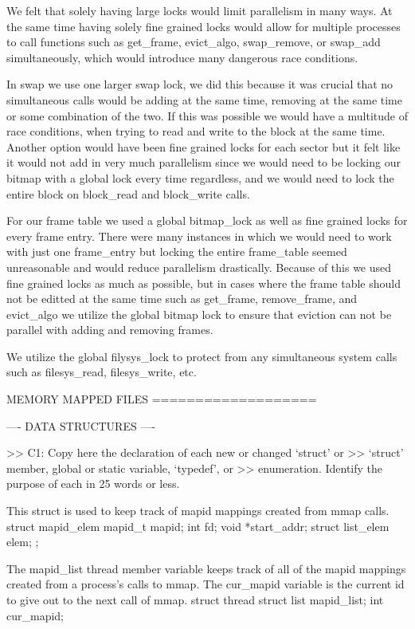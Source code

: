 We felt that solely having large locks would limit parallelism in many ways.
At the same time having solely fine grained locks would allow for multiple
processes to call functions such as get_frame, evict_algo, swap_remove, 
or swap_add simultaneously, which would introduce many dangerous race
conditions. 

In swap we use one larger swap lock, we did this because it was crucial that
no simultaneous calls would be adding at the same time, removing at the same
time or some combination of the two. If this was possible we would have a 
multitude of race conditions, when trying to read and write to the block
at the same time. Another option would have been fine grained locks for
each sector but it felt like it would not add in very much parallelism since
we would need to be locking our bitmap with a global lock every time 
regardless, and we would need to lock the entire block on block_read and
block_write calls.

For our frame table we used a global bitmap_lock as well as fine grained
locks for every frame entry. There were many instances in which we would
need to work with just one frame_entry but locking the entire frame_table
seemed unreasonable and would reduce parallelism drastically. Because of
this we used fine grained locks as much as possible, but in cases where
the frame table should not be editted at the same time such as get_frame,
remove_frame, and evict_algo we utilize the global bitmap lock to ensure
that eviction can not be parallel with adding and removing frames. 

We utilize the global filysys_lock to protect from any simultaneous system
calls such as filesys_read, filesys_write, etc. 

             MEMORY MAPPED FILES
             ===================

---- DATA STRUCTURES ----

>> C1: Copy here the declaration of each new or changed `struct' or
>> `struct' member, global or static variable, `typedef', or
>> enumeration.  Identify the purpose of each in 25 words or less.

This struct is used to keep track of mapid mappings created from mmap calls.
    struct mapid_elem
    {
        mapid_t mapid;
        int fd;
        void *start_addr;
        struct list_elem elem;
    };

The mapid_list thread member variable keeps track of all of the mapid mappings
created from a process's calls to mmap. The cur_mapid variable is the current
id to give out to the next call of mmap.
    struct thread
    {
       struct list mapid_list; 
       int cur_mapid; 
    }

